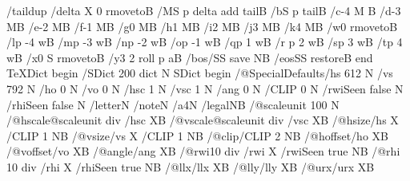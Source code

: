 /tail{dup /delta X 0 rmoveto}B /M{S p delta add tail}B /b{S p tail}B /c{-4 M}
B /d{-3 M}B /e{-2 M}B /f{-1 M}B /g{0 M}B /h{1 M}B /i{2 M}B /j{3 M}B /k{4 M}B
/w{0 rmoveto}B /l{p -4 w}B /m{p -3 w}B /n{p -2 w}B /o{p -1 w}B /q{p 1 w}B /r{
p 2 w}B /s{p 3 w}B /t{p 4 w}B /x{0 S rmoveto}B /y{3 2 roll p a}B /bos{/SS save
N}B /eos{SS restore}B end
TeXDict begin /SDict 200 dict N SDict begin /@SpecialDefaults{/hs 612 N /vs
792 N /ho 0 N /vo 0 N /hsc 1 N /vsc 1 N /ang 0 N /CLIP 0 N /rwiSeen false N
/rhiSeen false N /letter{}N /note{}N /a4{}N /legal{}N}B /@scaleunit 100 N
/@hscale{@scaleunit div /hsc X}B /@vscale{@scaleunit div /vsc X}B /@hsize{/hs
X /CLIP 1 N}B /@vsize{/vs X /CLIP 1 N}B /@clip{/CLIP 2 N}B /@hoffset{/ho X}B
/@voffset{/vo X}B /@angle{/ang X}B /@rwi{10 div /rwi X /rwiSeen true N}B /@rhi
{10 div /rhi X /rhiSeen true N}B /@llx{/llx X}B /@lly{/lly X}B /@urx{/urx X}B
